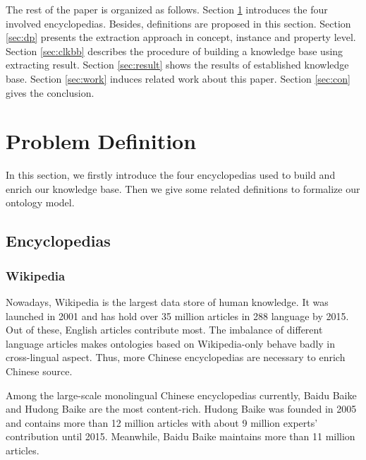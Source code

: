 \documentclass[runningheads,a4paper]{llncs}
\begin{document}
The rest of the paper is organized as follows. Section \ref{sec:pd} introduces the four involved encyclopedias. Besides, definitions are proposed in this section. Section \ref{sec:dp} presents the extraction approach in concept, instance and property level. Section \ref{sec:clkbb} describes the procedure of building a knowledge base using extracting result. Section \ref{sec:result} shows the results of established knowledge base. Section \ref{sec:work} induces related work about this paper. Section \ref{sec:con} gives the conclusion.

\section{Problem Definition}
\label{sec:pd}
In this section, we firstly introduce the four encyclopedias used to build and enrich our knowledge base. Then we give some related definitions to formalize our ontology model. 

\subsection{Encyclopedias}
\label{sec:encyclopedias}
\subsubsection{Wikipedia}
Nowadays, Wikipedia is the largest data store of human knowledge. It was launched in 2001 and has hold over 35 million articles in 288 language by 2015. Out of these, English articles contribute most. The imbalance of different language articles makes ontologies based on Wikipedia-only behave badly in cross-lingual aspect. Thus, more Chinese encyclopedias are necessary to enrich Chinese source.

Among the large-scale monolingual Chinese encyclopedias currently, Baidu Baike and Hudong Baike are the most content-rich. Hudong Baike was founded in 2005 and contains more than 12 million articles with about 9 million experts' contribution until 2015. Meanwhile, Baidu Baike maintains more than 11 million articles. 
\end{document}
